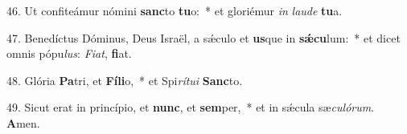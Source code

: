 46. Ut confiteámur nómini \textbf{sanc}to \textbf{tu}o:~*  et gloriémur \textit{in} \textit{lau}\textit{de} \textbf{tu}a.\

47. Benedíctus Dóminus, Deus Israël, a sǽculo et \textbf{us}que in \textbf{sǽ}\textbf{cu}lum:~*  et dicet omnis pópu\textit{lus}: \textit{Fi}\textit{at}, \textbf{fi}at.\

48. Glória \textbf{Pa}tri, et \textbf{Fí}\textbf{li}o,~*  et Spi\textit{rí}\textit{tu}\textit{i} \textbf{Sanc}to.\

49. Sicut erat in princípio, et \textbf{nunc}, et \textbf{sem}per,~*  et in sǽcula sæ\textit{cu}\textit{ló}\textit{rum}. \textbf{A}men.\


